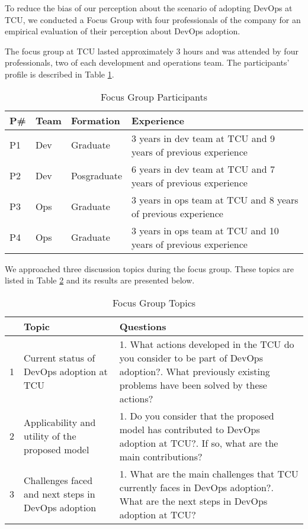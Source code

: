 {
\color{blue}
To reduce the bias of our perception about the scenario of adopting DevOps at
TCU, we conducted a Focus Group with four professionals of the company for an
empirical evaluation of their perception about DevOps adoption.

The focus group at TCU lasted approximately 3 hours and was attended by four
professionals, two of each development and operations team. The participants'
profile is described in Table \ref{focusgroup_part}.

\begin{table}[hb!]
\centering
\begin{tabular}{|p{0.6cm}|p{1.2cm}|p{2.5cm}|p{6cm}|} \hline
{\bf P\#} & {\bf Team} & {\bf Formation} & {\bf Experience}\\ \hline
P1 & Dev & Graduate & 3 years in dev team at TCU and 9 years of previous experience \\ \hline
P2 & Dev & Posgraduate & 6 years in dev team at TCU and 7 years of previous experience \\ \hline
P3 & Ops & Graduate & 3 years in ops team at TCU and 8 years of previous experience \\ \hline
P4 & Ops & Graduate & 3 years in ops team at TCU and 10 years of previous experience \\ \hline
\end{tabular}
\caption{Focus Group Participants}
\label{focusgroup_part}
\end{table}

We approached three discussion topics during the focus group. These topics are
listed in Table \ref{table_topics} and its results are presented below.

\begin{table}[hb!]
\centering
\begin{tabular}{|p{0.2cm}|p{3.4cm}|p{10cm}|} \hline
& \textbf{Topic} & \textbf{Questions} \\ \hline

1 & Current status of DevOps adoption at TCU &
1. What actions developed in the TCU do you consider to be part of DevOps adoption?\newline\newline
2. What previously existing problems have been solved by these actions? \\ \hline

2 & Applicability and utility of the proposed model &
1. Do you consider that the proposed model has contributed to DevOps adoption at TCU?\newline\newline
2. If so, what are the main contributions? \\ \hline

3 & Challenges faced and next steps in DevOps adoption &
1. What are the main challenges that TCU currently faces in DevOps adoption?\newline\newline
2. What are the next steps in DevOps adoption at TCU?\\ \hline

\end{tabular}
\caption{Focus Group Topics}
\label{table_topics}
\end{table}
}

